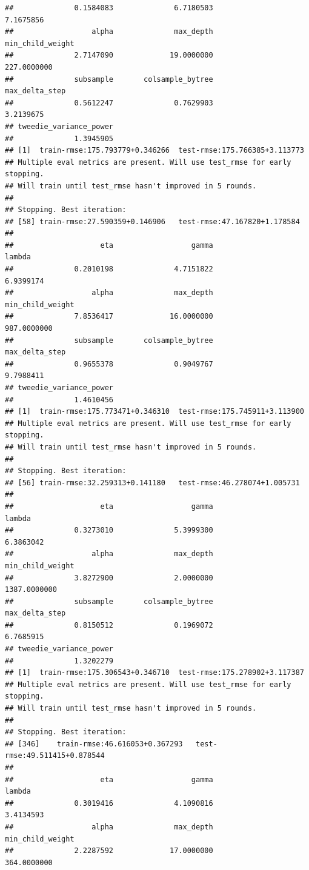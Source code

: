 \documentclass[
]{article}
\begin{document}
\begin{verbatim}
##              0.1584083              6.7180503              7.1675856 
##                  alpha              max_depth       min_child_weight 
##              2.7147090             19.0000000            227.0000000 
##              subsample       colsample_bytree         max_delta_step 
##              0.5612247              0.7629903              3.2139675 
## tweedie_variance_power 
##              1.3945905 
## [1]  train-rmse:175.793779+0.346266  test-rmse:175.766385+3.113773 
## Multiple eval metrics are present. Will use test_rmse for early stopping.
## Will train until test_rmse hasn't improved in 5 rounds.
## 
## Stopping. Best iteration:
## [58] train-rmse:27.590359+0.146906   test-rmse:47.167820+1.178584
## 
##                    eta                  gamma                 lambda 
##              0.2010198              4.7151822              6.9399174 
##                  alpha              max_depth       min_child_weight 
##              7.8536417             16.0000000            987.0000000 
##              subsample       colsample_bytree         max_delta_step 
##              0.9655378              0.9049767              9.7988411 
## tweedie_variance_power 
##              1.4610456 
## [1]  train-rmse:175.773471+0.346310  test-rmse:175.745911+3.113900 
## Multiple eval metrics are present. Will use test_rmse for early stopping.
## Will train until test_rmse hasn't improved in 5 rounds.
## 
## Stopping. Best iteration:
## [56] train-rmse:32.259313+0.141180   test-rmse:46.278074+1.005731
## 
##                    eta                  gamma                 lambda 
##              0.3273010              5.3999300              6.3863042 
##                  alpha              max_depth       min_child_weight 
##              3.8272900              2.0000000           1387.0000000 
##              subsample       colsample_bytree         max_delta_step 
##              0.8150512              0.1969072              6.7685915 
## tweedie_variance_power 
##              1.3202279 
## [1]  train-rmse:175.306543+0.346710  test-rmse:175.278902+3.117387 
## Multiple eval metrics are present. Will use test_rmse for early stopping.
## Will train until test_rmse hasn't improved in 5 rounds.
## 
## Stopping. Best iteration:
## [346]    train-rmse:46.616053+0.367293   test-rmse:49.511415+0.878544
## 
##                    eta                  gamma                 lambda 
##              0.3019416              4.1090816              3.4134593 
##                  alpha              max_depth       min_child_weight 
##              2.2287592             17.0000000            364.0000000 

\end{verbatim}
\end{document}
